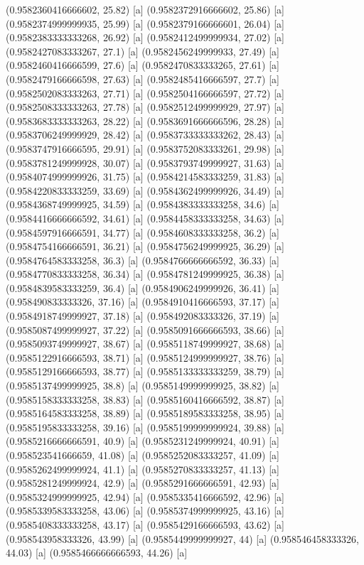{{{(0.9582360416666602, 25.82) [a] 
(0.9582372916666602, 25.86) [a] 
(0.9582374999999935, 25.99) [a] 
(0.9582379166666601, 26.04) [a] 
(0.9582383333333268, 26.92) [a] 
(0.9582412499999934, 27.02) [a] 
(0.9582427083333267, 27.1) [a] 
(0.9582456249999933, 27.49) [a] 
(0.9582460416666599, 27.6) [a] 
(0.9582470833333265, 27.61) [a] 
(0.9582479166666598, 27.63) [a] 
(0.9582485416666597, 27.7) [a] 
(0.9582502083333263, 27.71) [a] 
(0.9582504166666597, 27.72) [a] 
(0.9582508333333263, 27.78) [a] 
(0.9582512499999929, 27.97) [a] 
(0.9583683333333263, 28.22) [a] 
(0.9583691666666596, 28.28) [a] 
(0.9583706249999929, 28.42) [a] 
(0.9583733333333262, 28.43) [a] 
(0.9583747916666595, 29.91) [a] 
(0.9583752083333261, 29.98) [a] 
(0.9583781249999928, 30.07) [a] 
(0.9583793749999927, 31.63) [a] 
(0.9584074999999926, 31.75) [a] 
(0.9584214583333259, 31.83) [a] 
(0.9584220833333259, 33.69) [a] 
(0.9584362499999926, 34.49) [a] 
(0.9584368749999925, 34.59) [a] 
(0.9584383333333258, 34.6) [a] 
(0.9584416666666592, 34.61) [a] 
(0.9584458333333258, 34.63) [a] 
(0.9584597916666591, 34.77) [a] 
(0.9584608333333258, 36.2) [a] 
(0.9584754166666591, 36.21) [a] 
(0.9584756249999925, 36.29) [a] 
(0.9584764583333258, 36.3) [a] 
(0.9584766666666592, 36.33) [a] 
(0.9584770833333258, 36.34) [a] 
(0.9584781249999925, 36.38) [a] 
(0.9584839583333259, 36.4) [a] 
(0.9584906249999926, 36.41) [a] 
(0.958490833333326, 37.16) [a] 
(0.9584910416666593, 37.17) [a] 
(0.9584918749999927, 37.18) [a] 
(0.958492083333326, 37.19) [a] 
(0.9585087499999927, 37.22) [a] 
(0.9585091666666593, 38.66) [a] 
(0.9585093749999927, 38.67) [a] 
(0.9585118749999927, 38.68) [a] 
(0.9585122916666593, 38.71) [a] 
(0.9585124999999927, 38.76) [a] 
(0.9585129166666593, 38.77) [a] 
(0.9585133333333259, 38.79) [a] 
(0.9585137499999925, 38.8) [a] 
(0.9585149999999925, 38.82) [a] 
(0.9585158333333258, 38.83) [a] 
(0.9585160416666592, 38.87) [a] 
(0.9585164583333258, 38.89) [a] 
(0.9585189583333258, 38.95) [a] 
(0.9585195833333258, 39.16) [a] 
(0.9585199999999924, 39.88) [a] 
(0.9585216666666591, 40.9) [a] 
(0.9585231249999924, 40.91) [a] 
(0.958523541666659, 41.08) [a] 
(0.9585252083333257, 41.09) [a] 
(0.9585262499999924, 41.1) [a] 
(0.9585270833333257, 41.13) [a] 
(0.9585281249999924, 42.9) [a] 
(0.9585291666666591, 42.93) [a] 
(0.9585324999999925, 42.94) [a] 
(0.9585335416666592, 42.96) [a] 
(0.9585339583333258, 43.06) [a] 
(0.9585374999999925, 43.16) [a] 
(0.9585408333333258, 43.17) [a] 
(0.9585429166666593, 43.62) [a] 
(0.958543958333326, 43.99) [a] 
(0.9585449999999927, 44) [a] 
(0.958546458333326, 44.03) [a] 
(0.9585466666666593, 44.26) [a] 
}}}
